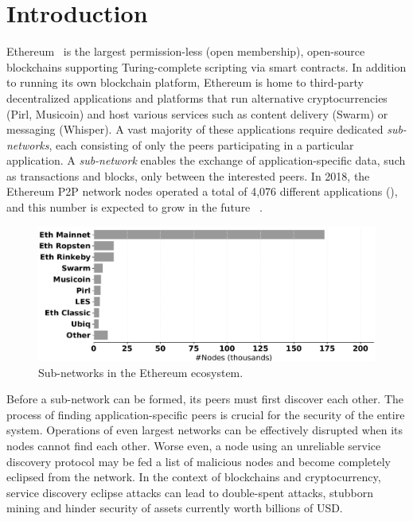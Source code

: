 
\section{Introduction}

Ethereum~\cite{buterin2013ethereum}  is the largest permission-less (\ie open membership), open-source blockchains supporting Turing-complete scripting via smart contracts. 
In addition to running its own blockchain platform, Ethereum is home to third-party decentralized applications and platforms that run alternative cryptocurrencies (Pirl, Musicoin) and host various services such as content delivery (Swarm) or messaging (Whisper).
A vast majority of these applications require dedicated \emph{sub-networks}, each consisting of only the peers participating in a particular application. A \emph{sub-network} enables the exchange of application-specific data, such as transactions and blocks, only between the interested peers. In 2018, the Ethereum P2P network nodes operated a total of 4,076 different applications (), and this number is expected to grow in the future~\cite{kim2018measuring} .

\begin{figure}
    \includegraphics[width=1\linewidth]{img/ecosystem}
    \caption{Sub-networks in the Ethereum ecosystem.}
    \label{fig:ecosystem}
\end{figure}

Before a sub-network can be formed, its peers must first discover each other. The process of finding application-specific peers is crucial for the security of the entire system. Operations of even largest networks can be effectively disrupted when its nodes cannot find each other. Worse even, a node using an unreliable service discovery protocol may be fed a list of malicious nodes and become completely eclipsed from the network. In the context of blockchains and cryptocurrency, service discovery eclipse attacks can lead to double-spent attacks, stubborn mining and hinder security of assets currently worth billions of USD. 

